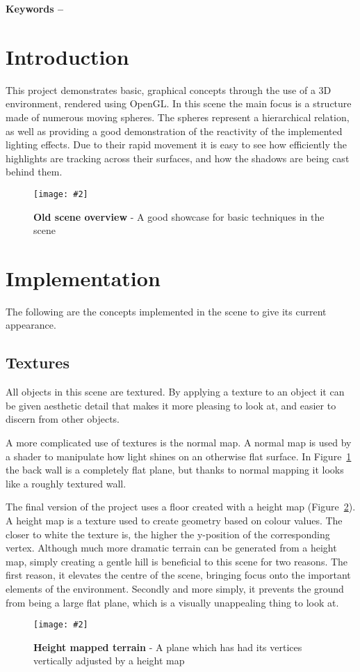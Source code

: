 \documentclass[10pt, a4paper]{article}
\title{\mytitle}
\author{\myauthor\hspace{1em}\\\contact\\Edinburgh Napier University\hspace{0.5em}-\hspace{0.5em}\mymodule}
\date{}
\newcommand{\figuremacro}[5]{
    \begin{figure}[#1]
        \centering
        \texttt{[image: \#2]}
        \caption[#3]{\textbf{#3}#4}
        \label{fig:#2}
    \end{figure}
}
\begin{document}
	\maketitle
	\begin{abstract}
		This is a project which demonstrates the implementation of basic lighting, shadowing, and texturing effects, in a 3D graphical scene.
	\end{abstract}
    
	\textbf{Keywords -- }{\mykeywords}
	\section{Introduction}
	This project demonstrates basic, graphical concepts through the use of a 3D environment, rendered using OpenGL.  In this scene the main focus is a structure made of numerous moving spheres.  The spheres represent a hierarchical relation, as well as providing a good demonstration of the reactivity of the implemented lighting effects.  Due to their rapid movement it is easy to see how efficiently the highlights are tracking across their surfaces, and how the shadows are being cast behind them.
    
    \figuremacro{h}{basic_scene}{Old scene overview}{ - A good showcase for basic techniques in the scene}{1.0}
	
	\section{Implementation}
	The following are the concepts implemented in the scene to give its current appearance.
	
	\subsection{Textures}
	All objects in this scene are textured.  By applying a texture to an object it can be given aesthetic detail that makes it more pleasing to look at, and easier to discern from other objects.
	
	A more complicated use of textures is the normal map.  A normal map is used by a shader to manipulate how light shines on an otherwise flat surface.  In Figure~\ref{fig:basic_scene} the back wall is a completely flat plane, but thanks to normal mapping it looks like a roughly textured wall.
	
	The final version of the project uses a floor created with a height map (Figure~\ref{fig:terrain}).  A height map is a texture used to create geometry based on colour values.  The closer to white the texture is, the higher the y-position of the corresponding vertex.  Although much more dramatic terrain can be generated from a height map, simply creating a gentle hill is beneficial to this scene for two reasons.  The first reason, it elevates the centre of the scene, bringing focus onto the important elements of the environment.  Secondly and more simply, it prevents the ground from being a large flat plane, which is a visually unappealing thing to look at.
	\figuremacro{h}{terrain}{Height mapped terrain}{ - A plane which has had its vertices vertically adjusted by a height map}{1.0}
	
\end{document}
